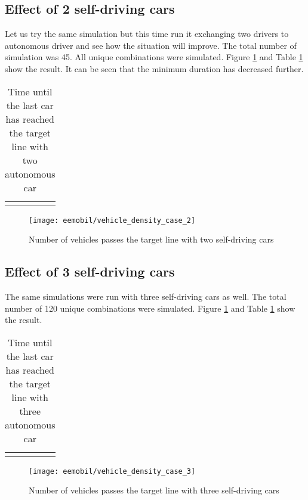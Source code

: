 		\subsection{Effect of 2 self-driving cars}
		Let us try the same simulation but this time run it exchanging two drivers to autonomous driver and see how the situation will improve. The total number of simulation was 45. All unique combinations were simulated. Figure \ref{fig:vehicle_density_case_2} and Table \ref{tab:vehicle_density_minmaxavg_case2} show the result.
		It can be seen that the minimum duration has decreased further.
		\begin{table}
			\begin{center}
				\begin{tabular}{ |c|c|c|c|}
					\hline
					\vehicledensitytable{2}
					\hline
				\end{tabular}
			\end{center}
			\caption{Time until the last car has reached the target line with two autonomous car}
			\label{tab:vehicle_density_minmaxavg_case2}
		\end{table}
		\begin{figure}
			\centering
			\texttt{[image: eemobil/vehicle\_density\_case\_2]}
			\caption{Number of vehicles passes the target line with two self-driving cars}
			\label{fig:vehicle_density_case_2}
		\end{figure}

		\subsection{Effect of 3 self-driving cars}
		The same simulations were run with three self-driving cars as well. The total number of 120 unique combinations were simulated. Figure \ref{fig:vehicle_density_case_2} and Table \ref{tab:vehicle_density_minmaxavg_case2} show the result.
		\begin{table}
			\begin{center}
				\begin{tabular}{ |c|c|c|c|}
					\hline
					\vehicledensitytable{3}
					\hline
				\end{tabular}
			\end{center}
			\caption{Time until the last car has reached the target line with three autonomous car}
			\label{tab:vehicle_density_minmaxavg_case3}
		\end{table}
		\begin{figure}
			\centering
			\texttt{[image: eemobil/vehicle\_density\_case\_3]}
			\caption{Number of vehicles passes the target line with three self-driving cars}
			\label{fig:vehicle_density_case_3}
		\end{figure}
